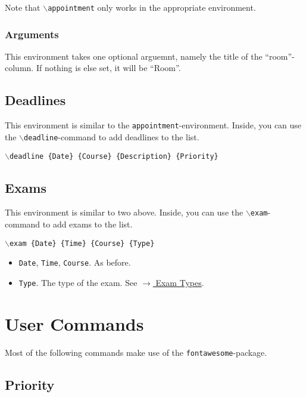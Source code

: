 \documentclass{article}
\newcommand{\cmd}[1]{$\backslash$\texttt{{#1}}}
\begin{document}
	Note that \cmd{appointment} only works in the appropriate environment.
	
	\subsubsection{Arguments}
	This environment takes one optional arguemnt, namely the title of the \enquote{room}-column. If nothing is else set, it will be \enquote{Room}.

	\subsection{Deadlines}
	\label{deadlines}
	This environment is similar to the \texttt{appointment}-environment. Inside, you can use the \cmd{deadline}-command to add deadlines to the list.
	\begin{center}
		\cmd{deadline \{Date\} \{Course\} \{Description\} \{Priority\}}
	\end{center}
	


	\subsection{Exams}
	\label{Exams}
	This environment is similar to two above. Inside, you can use the \cmd{exam}-command to add exams to the list.
	\begin{center}
		\cmd{exam \{Date\} \{Time\} \{Course\} \{Type\}}
	\end{center}
	\begin{itemize}
		\item \texttt{Date}, \texttt{Time}, \texttt{Course}.
		As before.
		
		\item \texttt{Type}.
		The type of the exam. See \hyperref[examtypes]{$\rightarrow$ Exam Types}.
	\end{itemize}


	\pagebreak
	\section{User Commands}
	Most of the following commands make use of the \texttt{fontawesome}-package.
	\subsection{Priority}
	\label{priority}
	
\end{document}
